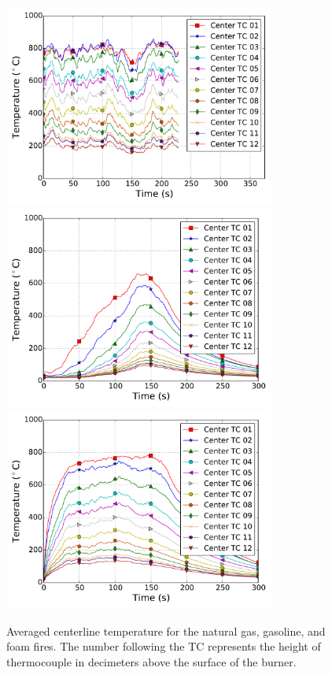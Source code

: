 \documentclass[twoside]{uocthesis}
\begin{document}
{\begin{figure}[p]
  \centering
  \includegraphics[width=3.5in]{../Figures/FHNG_TC_Plume_Avg}\\
  \includegraphics[width=3.5in]{../Figures/FHPUF_TC_Plume_Avg}\\
  \includegraphics[width=3.5in]{../Figures/FHGAS_TC_Plume_Avg}\\
  \caption[Averaged centerline temperature for the natural gas, gasoline, and foam fires]{Averaged centerline temperature for the natural gas, gasoline, and foam fires. The number following the TC represents the height of thermocouple in decimeters  above the surface of the burner.}
  \label{Temp}
\end{figure}


}
\end{document}
